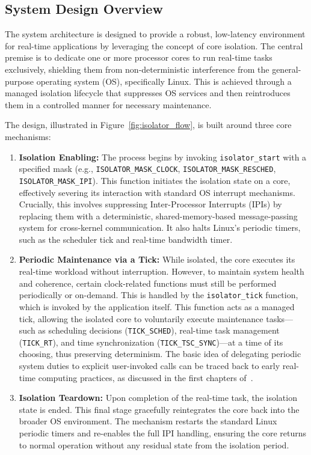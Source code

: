 \documentclass[letterpaper]{article}
\begin{document}
\subsection{System Design Overview}
\label{subsec:system-design}

The system architecture is designed to provide a robust, low-latency environment for real-time applications by leveraging the concept of core isolation. The central premise is to dedicate one or more processor cores to run real-time tasks exclusively, shielding them from non-deterministic interference from the general-purpose operating system (OS), specifically Linux. This is achieved through a managed isolation lifecycle that suppresses OS services and then reintroduces them in a controlled manner for necessary maintenance.

The design, illustrated in Figure~\ref{fig:isolator_flow}, is built around three core mechanisms:

\begin{enumerate}
    \item \textbf{Isolation Enabling:} The process begins by invoking \texttt{isolator\_start} with a specified mask (e.g., \texttt{ISOLATOR\_MASK\_CLOCK}, \texttt{ISOLATOR\_MASK\_RESCHED}, \texttt{ISOLATOR\_MASK\_IPI}). This function initiates the isolation state on a core, effectively severing its interaction with standard OS interrupt mechanisms. Crucially, this involves suppressing Inter-Processor Interrupts (IPIs) by replacing them with a deterministic, shared-memory-based message-passing system for cross-kernel communication. It also halts Linux's periodic timers, such as the scheduler tick and real-time bandwidth timer.

    \item \textbf{Periodic Maintenance via a Tick:} While isolated, the core executes its real-time workload without interruption. However, to maintain system health and coherence, certain clock-related functions must still be performed periodically or on-demand. This is handled by the \texttt{isolator\_tick} function, which is invoked by the application itself. This function acts as a managed tick, allowing the isolated core to voluntarily execute maintenance tasks---such as scheduling decisions (\texttt{TICK\_SCHED}), real-time task management (\texttt{TICK\_RT}), and time synchronization (\texttt{TICK\_TSC\_SYNC})---at a time of its choosing, thus preserving determinism. The basic idea of delegating periodic system duties to explicit user-invoked calls can be traced back to early real-time computing practices, as discussed in the first chapters of~\cite{mellichamp1983}.

    \item \textbf{Isolation Teardown:} Upon completion of the real-time task, the isolation state is ended. This final stage gracefully reintegrates the core back into the broader OS environment. The mechanism restarts the standard Linux periodic timers and re-enables the full IPI handling, ensuring the core returns to normal operation without any residual state from the isolation period.
\end{enumerate}
\end{document}
